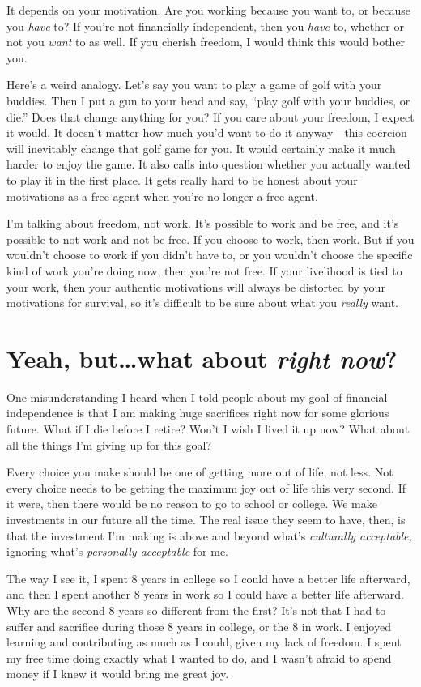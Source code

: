 It depends on your motivation. Are you working because you want to, or because you \emph{have} to? If you're not financially independent, then you \emph{have} to, whether or not you \emph{want} to as well. If you cherish freedom, I would think this would bother you.

Here's a weird analogy. Let's say you want to play a game of golf with your buddies. Then I put a gun to your head and say, ``play golf with your buddies, or die.'' Does that change anything for you? If you care about your freedom, I expect it would. It doesn't matter how much you'd want to do it anyway---this coercion will inevitably change that golf game for you. It would certainly make it much harder to enjoy the game. It also calls into question whether you actually wanted to play it in the first place. It gets really hard to be honest about your motivations as a free agent when you're no longer a free agent.

I'm talking about freedom, not work. It's possible to work and be free, and it's possible to not work and not be free. If you choose to work, then work. But if you wouldn't choose to work if you didn't have to, or you wouldn't choose the specific kind of work you're doing now, then you're not free. If your livelihood is tied to your work, then your authentic motivations will always be distorted by your motivations for survival, so it's difficult to be sure about what you \emph{really} want.

\section{Yeah, but\ldots what about \emph{right now}?}
One misunderstanding I heard when I told people about my goal of financial independence is that I am making huge sacrifices right now for some glorious future. What if I die before I retire? Won't I wish I lived it up now? What about all the things I'm giving up for this goal?

Every choice you make should be one of getting more out of life, not less. Not every choice needs to be getting the maximum joy out of life this very second. If it were, then there would be no reason to go to school or college. We make investments in our future all the time. The real issue they seem to have, then, is that the investment I'm making is above and beyond what's \emph{culturally acceptable,} ignoring what's \emph{personally acceptable} for me.

The way I see it, I spent 8 years in college so I could have a better life afterward, and then I spent another 8 years in work so I could have a better life afterward. Why are the second 8 years so different from the first? It's not that I had to suffer and sacrifice during those 8 years in college, or the 8 in work. I enjoyed learning and contributing as much as I could, given my lack of freedom. I spent my free time doing exactly what I wanted to do, and I wasn't afraid to spend money if I knew it would bring me great joy.

